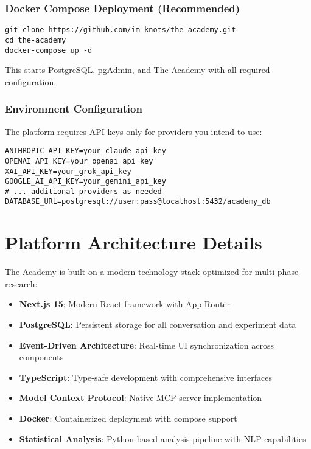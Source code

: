 \documentclass[11pt,letterpaper]{article}
\newcommand{\theacademy}{The Academy}
\begin{document}
\subsubsection{Docker Compose Deployment (Recommended)}
\begin{verbatim}
git clone https://github.com/im-knots/the-academy.git
cd the-academy
docker-compose up -d
\end{verbatim}

This starts PostgreSQL, pgAdmin, and The Academy with all required configuration.

\subsubsection{Environment Configuration}
The platform requires API keys only for providers you intend to use:
\begin{verbatim}
ANTHROPIC_API_KEY=your_claude_api_key
OPENAI_API_KEY=your_openai_api_key  
XAI_API_KEY=your_grok_api_key
GOOGLE_AI_API_KEY=your_gemini_api_key
# ... additional providers as needed
DATABASE_URL=postgresql://user:pass@localhost:5432/academy_db
\end{verbatim}

\section{Platform Architecture Details}
\label{app:architecture}

\theacademy{} is built on a modern technology stack optimized for multi-phase research:

\begin{itemize}
    \item \textbf{Next.js 15}: Modern React framework with App Router
    \item \textbf{PostgreSQL}: Persistent storage for all conversation and experiment data
    \item \textbf{Event-Driven Architecture}: Real-time UI synchronization across components
    \item \textbf{TypeScript}: Type-safe development with comprehensive interfaces
    \item \textbf{Model Context Protocol}: Native MCP server implementation
    \item \textbf{Docker}: Containerized deployment with compose support
    \item \textbf{Statistical Analysis}: Python-based analysis pipeline with NLP capabilities
\end{itemize}
\end{document}
